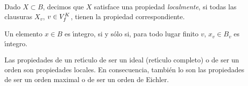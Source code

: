Dado $X\subset B$, decimos que $X$ satisface una propiedad \emph{localmente},
si todas las clausuras $X_{v}$, $v\in\lugares[f]{K}$, tienen la propiedad
correspondiente.

\begin{obsElementoLocalmenteIntegroEsIntegro}%
	\label{obs:elementolocalmenteintegroesintegro}
	Un elemento $x\in B$ es \'{\i}ntegro, si y s\'{o}lo si, para todo lugar
	finito $v$, $x_{v}\in B_{v}$ es \'{\i}ntegro.
\end{obsElementoLocalmenteIntegroEsIntegro}

\begin{propoAlgunasPropiedadesLocales}\label{propo:algunaspropiedadeslocales}
	Las propiedades de un ret\'{\i}culo de ser un ideal (ret\'{\i}culo
	completo) o de ser un orden son propiedades locales. En consecuencia,
	tambi\'{e}n lo son las propiedades de ser un orden maximal o de ser un
	orden de Eichler.
\end{propoAlgunasPropiedadesLocales}

